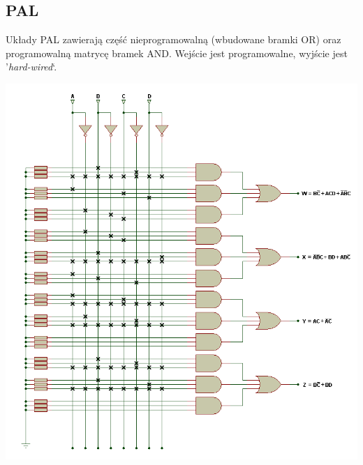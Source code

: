 \documentclass[12pt]{article}
\begin{document}
    \subsection{PAL}
        Układy PAL zawierają część nieprogramowalną (wbudowane bramki OR) oraz programowalną
        matrycę bramek AND.
        Wejście jest programowalne, wyjście jest '\textit{hard-wired}`.
            \begin{center}
                \includegraphics[scale=0.7]{graphics/pal.png}
            \end{center}
\end{document}
